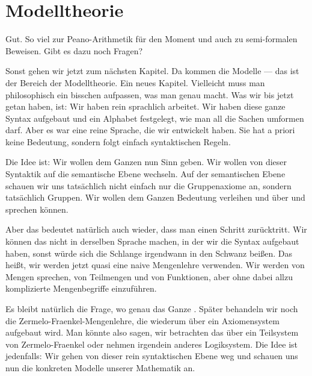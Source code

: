 \section{Modelltheorie}

\begin{spoken-clean}[00:31:45 - 00:33:15]
Gut. So viel zur Peano-Arithmetik für den Moment und auch zu semi-formalen Beweisen. Gibt es dazu noch Fragen?

Sonst gehen wir jetzt zum nächsten Kapitel. Da kommen die Modelle --- das ist der Bereich der Modelltheorie. Ein neues Kapitel.  Vielleicht muss man philosophisch ein bisschen aufpassen, was man genau macht. Was wir bis jetzt getan haben, ist: Wir haben rein sprachlich arbeitet. Wir haben diese ganze Syntax aufgebaut und ein Alphabet festgelegt, wie man all die Sachen umformen darf. Aber es war eine reine Sprache, die wir entwickelt haben. Sie hat a priori keine Bedeutung, sondern folgt einfach syntaktischen Regeln.
\end{spoken-clean}

\begin{spoken-clean}[00:33:15 - 00:35:40]
Die Idee ist: Wir wollen dem Ganzen nun Sinn geben. Wir wollen von dieser Syntaktik auf die semantische Ebene wechseln. Auf der semantischen Ebene schauen wir uns tatsächlich nicht einfach nur die Gruppenaxiome an, sondern tatsächlich Gruppen. Wir wollen dem Ganzen Bedeutung verleihen und über  und  sprechen können.

Aber das bedeutet natürlich auch wieder, dass man einen Schritt zurücktritt. Wir können das nicht in derselben Sprache machen, in der wir die Syntax aufgebaut haben, sonst würde sich die Schlange irgendwann in den Schwanz beißen. Das heißt, wir werden jetzt quasi eine naive Mengenlehre verwenden. Wir werden von Mengen sprechen, von Teilmengen und von Funktionen, aber ohne dabei allzu komplizierte Mengenbegriffe einzuführen.

Es bleibt natürlich die Frage, wo genau das Ganze . Später behandeln wir noch die Zermelo-Fraenkel-Mengenlehre, die wiederum über ein Axiomensystem aufgebaut wird. Man könnte also sagen, wir betrachten das über ein Teilsystem von Zermelo-Fraenkel oder nehmen irgendein anderes Logiksystem. Die Idee ist jedenfalls: Wir gehen von dieser rein syntaktischen Ebene weg und schauen uns nun die konkreten Modelle unserer Mathematik an.
\end{spoken-clean}

